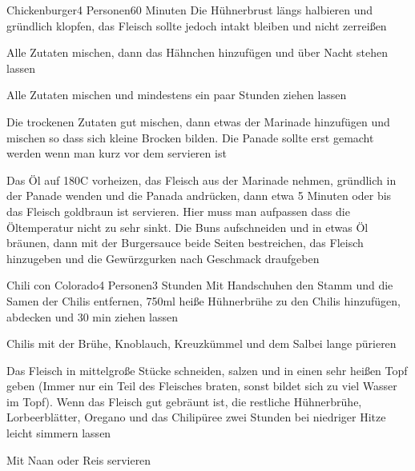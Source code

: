 \begin{recipe}{Chickenburger}{4 Personen}{60 Minuten}
Die Hühnerbrust längs halbieren und gründlich klopfen, das Fleisch sollte jedoch intakt bleiben und nicht zerreißen

Alle Zutaten mischen, dann das Hähnchen hinzufügen und über Nacht stehen lassen

Alle Zutaten mischen und mindestens ein paar Stunden ziehen lassen

Die trockenen Zutaten gut mischen, dann etwas der Marinade hinzufügen und mischen so dass sich kleine Brocken bilden. Die Panade sollte erst gemacht werden wenn man kurz vor dem servieren ist

Das Öl auf 180\0C vorheizen, das Fleisch aus der Marinade nehmen, gründlich in der Panade wenden und die Panada andrücken, dann etwa 5 Minuten oder bis das Fleisch goldbraun ist servieren. Hier muss man aufpassen dass die Öltemperatur nicht zu sehr sinkt. 
Die Buns aufschneiden und in etwas Öl bräunen, dann mit der Burgersauce beide Seiten bestreichen, das Fleisch hinzugeben und die Gewürzgurken nach Geschmack draufgeben
\end{recipe}


\begin{recipe}{Chili con Colorado}{4 Personen}{3 Stunden}
Mit Handschuhen den Stamm und die Samen der Chilis entfernen,
750ml heiße Hühnerbrühe zu den Chilis hinzufügen, abdecken und 30 min ziehen lassen

Chilis mit der Brühe, Knoblauch, Kreuzkümmel und dem Salbei lange pürieren

Das Fleisch in mittelgroße Stücke schneiden, salzen und in einen sehr heißen Topf geben (Immer nur ein Teil des Fleisches braten, sonst bildet sich zu viel Wasser im Topf).
Wenn das Fleisch gut gebräunt ist, die restliche Hühnerbrühe, Lorbeerblätter, Oregano und das Chilipüree zwei Stunden bei niedriger Hitze leicht simmern lassen

Mit Naan oder Reis servieren
\end{recipe}

